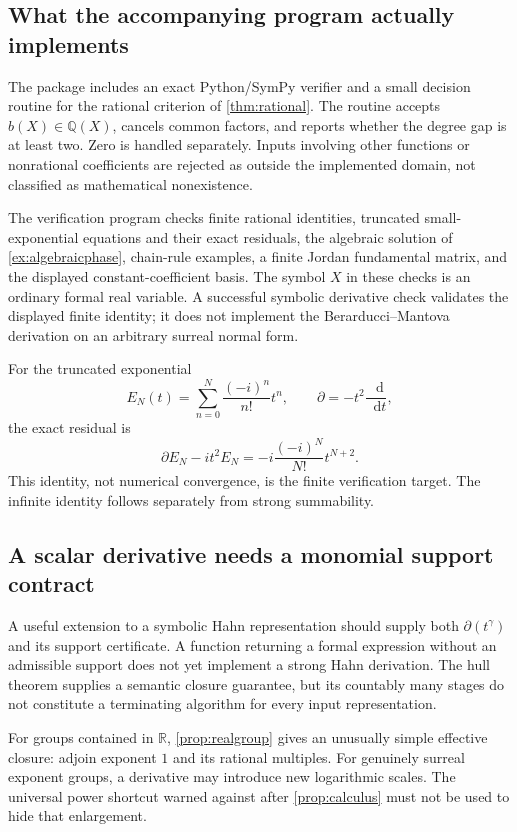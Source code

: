 \documentclass[11pt,a4paper]{article}
\theoremstyle{definition}
\newcommand{\R}{\mathbb R}
\newcommand{\Q}{\mathbb Q}
\newcommand{\D}{\partial}
\newcommand{\dd}{\mathop{}\!\mathrm d}
\numberwithin{equation}{section}
\begin{document}
\subsection{What the accompanying program actually implements}
The package includes an exact Python/SymPy verifier and a small decision
routine for the rational criterion of \cref{thm:rational}. The routine
accepts $b(X)\in\Q(X)$, cancels common factors, and reports whether the
degree gap is at least two. Zero is handled separately. Inputs involving
other functions or nonrational coefficients are rejected as outside the
implemented domain, not classified as mathematical nonexistence.

The verification program checks finite rational identities, truncated
small-exponential equations and their exact residuals, the algebraic
solution of \cref{ex:algebraicphase}, chain-rule examples, a finite Jordan
fundamental matrix, and the displayed constant-coefficient basis.
The symbol $X$ in these checks is an ordinary formal real variable. A
successful symbolic derivative check validates the displayed finite
identity; it does not implement the Berarducci--Mantova derivation on an
arbitrary surreal normal form.

For the truncated exponential
\[
 E_N(t)=\sum_{n=0}^N\frac{(-i)^n}{n!}t^n,
 \qquad\D=-t^2\frac{\dd}{\dd t},
\]
the exact residual is
\begin{equation}\label{eq:truncresidual}
 \D E_N-it^2E_N
 =-i\frac{(-i)^N}{N!}t^{N+2}.
\end{equation}
This identity, not numerical convergence, is the finite verification target.
The infinite identity follows separately from strong summability.

\subsection{A scalar derivative needs a monomial support contract}
A useful extension to a symbolic Hahn representation should supply both
$\D(t^\gamma)$ and its support certificate. A function returning a formal
expression without an admissible support does not yet implement a strong
Hahn derivation. The hull theorem supplies a semantic closure guarantee,
but its countably many stages do not constitute a terminating algorithm
for every input representation.

For groups contained in $\R$, \cref{prop:realgroup} gives an unusually
simple effective closure: adjoin exponent $1$ and its rational multiples.
For genuinely surreal exponent groups, a derivative may introduce new
logarithmic scales. The universal power shortcut warned against after
\cref{prop:calculus} must not be used to hide that enlargement.
\end{document}
